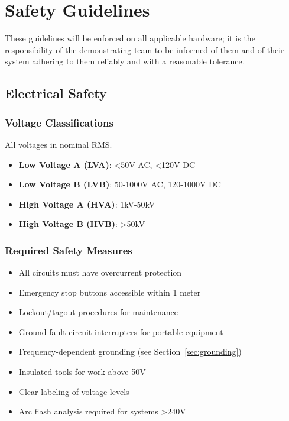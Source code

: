 
\section{Safety Guidelines}

These guidelines will be enforced on all applicable hardware; it is the responsibility of the demonstrating team to be informed of them and of their system adhering to them reliably and with a reasonable tolerance.

\subsection{Electrical Safety}

\subsubsection{Voltage Classifications}
All voltages in nominal RMS.
\begin{itemize}[noitemsep]
    \item \textbf{Low Voltage A (LVA)}: <50V AC, <120V DC
    \item \textbf{Low Voltage B (LVB)}: 50-1000V AC, 120-1000V DC
    \item \textbf{High Voltage A (HVA)}: 1kV-50kV
    \item \textbf{High Voltage B (HVB)}: >50kV
\end{itemize}

\subsubsection{Required Safety Measures}
\begin{itemize}[noitemsep]
    \item All circuits must have overcurrent protection
    \item Emergency stop buttons accessible within 1 meter
    \item Lockout/tagout procedures for maintenance  
    \item Ground fault circuit interrupters for portable equipment
    \item Frequency-dependent grounding (see Section~\ref{sec:grounding})
    \item Insulated tools for work above 50V
    \item Clear labeling of voltage levels
    \item Arc flash analysis required for systems >240V
\end{itemize}

